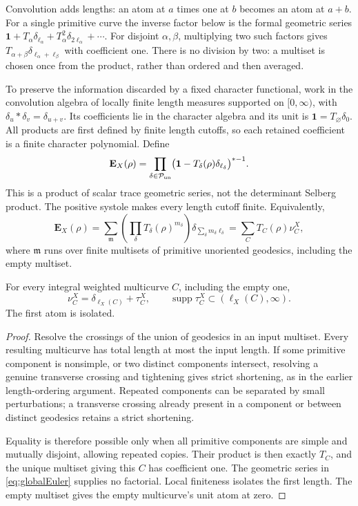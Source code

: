 Convolution adds lengths: an atom at $a$ times one at $b$ becomes
an atom at $a+b$. For a single primitive curve the inverse factor
below is the formal geometric series
$\mathbf1+T_\alpha\delta_{\ell_\alpha}
 +T_\alpha^2\delta_{2\ell_\alpha}+\cdots$.
For disjoint $\alpha,\beta$, multiplying two such factors gives
$T_{\alpha+\beta}\delta_{\ell_\alpha+\ell_\beta}$ with coefficient
one. There is no division by two: a multiset is chosen once from
the product, rather than ordered and then averaged.

To preserve the information discarded by a fixed character
functional, work in the convolution algebra of locally finite
length measures supported on $[0,\infty)$, with
$\delta_u*\delta_v=\delta_{u+v}$.
Its coefficients lie in the character algebra and its unit is
$\mathbf1=T_\varnothing\delta_0$. All products are first defined
by finite length cutoffs, so each retained coefficient is a finite
character polynomial. Define
\begin{equation}
 \mathbf E_X(\rho)=
 \prod_{\delta\in\mathcal P_{\rm un}}
 \bigl(\mathbf1-T_\delta(\rho)\delta_{\ell_\delta}\bigr)^{*-1}.
 \label{eq:globalEuler}
\end{equation}
This is a product of scalar trace geometric series, not the
determinant Selberg product. The positive systole makes every
length cutoff finite. Equivalently,
\[
 \mathbf E_X(\rho)=
 \sum_{\mathfrak m}
   \left(\prod_\delta T_\delta(\rho)^{m_\delta}\right)
   \delta_{\sum_\delta m_\delta\ell_\delta}
 =\sum_C T_C(\rho)\nu_C^X,
\]
where $\mathfrak m$ runs over finite multisets of primitive
unoriented geodesics, including the empty multiset.

\begin{proposition}
\label{prop:globaldiagonal}
For every integral weighted multicurve $C$, including the empty one,
\begin{equation}
 \boxed{
 \nu_C^X=\delta_{\ell_X(C)}+\tau_C^X,\qquad
 \operatorname{supp}\tau_C^X\subset(\ell_X(C),\infty).
 }
 \label{eq:globaldiagonal}
\end{equation}
The first atom is isolated.
\end{proposition}

\begin{proof}
Resolve the crossings of the union of geodesics in an input
multiset. Every resulting multicurve has total length at most
the input length. If some primitive component is nonsimple, or
two distinct components intersect, resolving a genuine transverse
crossing and tightening gives strict shortening, as in the earlier
length-ordering argument. Repeated components can be separated by
small perturbations; a transverse crossing already present in a
component or between distinct geodesics retains a strict shortening.

Equality is therefore possible only when all primitive components
are simple and mutually disjoint, allowing repeated copies.
Their product is then exactly $T_C$, and the unique multiset giving
this $C$ has coefficient one. The geometric series in
\eqref{eq:globalEuler} supplies no factorial. Local finiteness
isolates the first length. The empty multiset gives the empty
multicurve's unit atom at zero.
\end{proof}

